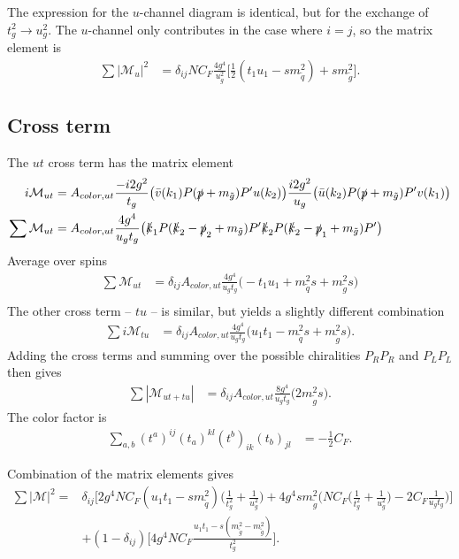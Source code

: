 \documentclass[twoside,english]{uiofysmaster}
\begin{document}
The expression for the $u$-channel diagram is identical, but for the exchange of $t_g^2 \rightarrow u_g^2$. The $u$-channel only contributes in the case where $i =j$, so the matrix element is
\begin{align*}
\sum |\mathcal{M}_u|^2 &= \delta_{ij} NC_F \frac{4g^4}{u_g^2} \Big[ \frac{1}{2}(t_1u_1-sm_{\tilde{q}}^2) + sm_{\tilde{g}}^2 \Big]. 
\end{align*}


\subsection*{Cross term}
The $ut$ cross term has the matrix element
\begin{align*}
i \mathcal{M}_{ut} &= A_{color, ut}\frac{-i 2 g^2}{t_g}\big( \bar{v} (k_1)  P (\slashed{p} + m_{\tilde{g}}) P'u(k_2) \big)  \frac{i 2 g^2}{u_g} \big( \bar{u} (k_2)  P (\slashed{p} + m_{\tilde{g}}) P' v(k_1) \big)\\
\sum \mathcal{M}_{ut} &= A_{color, ut} \frac{4 g^4}{u_gt_g}\big( \slashed{k}_1   P (\slashed{k}_2 - \slashed{p}_2 + m_{\tilde{g}}) P'\slashed{k}_2  P (\slashed{k}_2 -\slashed{p}_1 + m_{\tilde{g}}) P' \big)\\
\end{align*}
Average over spins
\begin{align*}
\sum  \mathcal{M}_{ut} 
  &= \delta_{ij} A_{color, ut} \frac{4 g^4}{u_gt_g} \big(
  -   t_1 u_1 + m_{\tilde{q}}^2 s 
+  m_{\tilde{g}}^2 s
  \big)\\
\end{align*}
The other cross term --  $tu$ -- is similar, but yields a slightly different combination
\begin{align*}
\sum i \mathcal{M}_{tu} 
  &= \delta_{ij} A_{color, ut} \frac{4 g^4}{u_gt_g} \big(
u_1t_1- m_{\tilde{q}}^2s + m_{\tilde{g}}^2s
  \big).
\end{align*}
Adding the cross terms and summing over the possible chiralities $P_RP_R$ and $P_LP_L$ then gives 
\begin{align*}
\sum |\mathcal{M}_{ut+tu}| &= \delta_{ij} A_{color, ut} \frac{8 g^4}{u_gt_g} \big(2 m_{\tilde{g}}^2s   \big).
\end{align*}
The color factor is
\begin{align*}
\sum_{a,b}(t^a)^{ij}(t_a)^{kl}(t^b)_{ik}(t_b)_{jl} 
 &= - \frac{1}{2}C_F.
\end{align*}



Combination of the matrix elements gives
\begin{align*}
\sum |\mathcal{M}|^2 =& \delta_{ij}  \Bigg[2 g^4NC_F(u_1t_1-sm_{\tilde{q}}^2) \big( \frac{1}{t_g^2} + \frac{1}{u_g^2} \big) + 4 g^4 sm_{\tilde{g}}^2 \Big( NC_F \big(\frac{1}{t_g^2} + \frac{1}{u_g^2}\big) -2C_F\frac{1}{u_gt_g} \Big) \Bigg]\\
&+ (1-\delta_{ij})\Bigg[4g^4NC_F  \frac{u_1t_1-s(m_{\tilde{g}}^2-m_{\tilde{g}}^2)}{t_g^2} \Bigg].
\end{align*}
\end{document}
